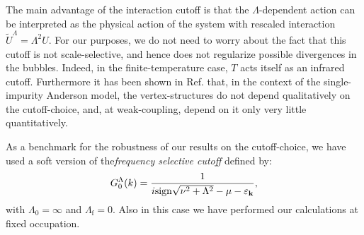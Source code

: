 The main advantage of the interaction cutoff is that  the $\Lambda$-dependent action can be interpreted\cite{Honerkamp2004} as the physical action of the system with rescaled interaction $\tilde{U}^\Lambda = \Lambda^2 U$.
For our purposes, we do not need to worry about the fact  that this cutoff is not scale-selective, and hence does not regularize possible divergences in the bubbles. Indeed, in the finite-temperature case, $T$ acts itself as an infrared cutoff.
Furthermore it has been shown in Ref.  that, in the context of the single-impurity Anderson model, the vertex-structures do not depend qualitatively on the cutoff-choice, and, at weak-coupling, depend on it only very little quantitatively. 

As a benchmark for the robustness of our results on the cutoff-choice, we have used a soft version of the\textit{frequency selective cutoff} defined\cite{Eberlein2014} by:
\begin{equation}
G_0^\Lambda(k) = \frac{1}{i\mathrm{sign}\sqrt{\nu^2+\Lambda^2 }-\mu- \varepsilon_{\mathbf{k}}},  
\end{equation}  
with $\Lambda_0=\infty$ and $\Lambda_{\mathrm{f}}=0$. Also in this case we have performed our calculations at fixed occupation. 


   
